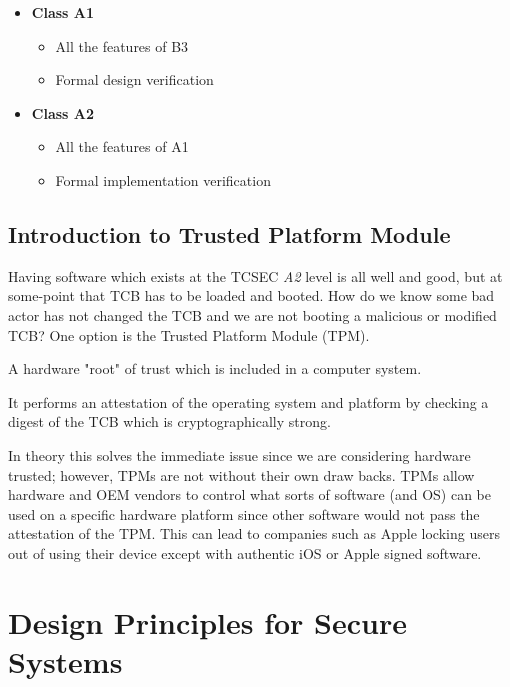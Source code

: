 \begin{itemize}
      \item \textbf{Class A1}
      \begin{itemize}
        \item All the features of B3
        \item Formal design verification
      \end{itemize}
      \item \textbf{Class A2}
      \begin{itemize}
        \item All the features of A1
        \item Formal implementation verification
      \end{itemize}
    \end{itemize}

  \subsection{Introduction to Trusted Platform Module}
  \label{ssec:intro_to_tpm}

    Having software which exists at the TCSEC \textit{A2} level is all well and good, but at some-point
      that TCB has to be loaded and booted.
    How do we know some bad actor has not changed the TCB and we are not booting a malicious or modified TCB?
    One option is the Trusted Platform Module (TPM).

    \begin{defbox}
      A hardware "root" of trust which is included in a computer system.

      It performs an attestation of the operating system and platform by checking a digest 
        of the TCB which is cryptographically strong.
    \end{defbox}

    In theory this solves the immediate issue since we are considering hardware trusted;
      however, TPMs are not without their own draw backs.
    TPMs allow hardware and OEM vendors to control what sorts of software (and OS) can be used
      on a specific hardware platform since other software would not pass the attestation of the TPM.
    This can lead to companies such as Apple locking users out of using their device except with authentic iOS
      or Apple signed software.

\section{Design Principles for Secure Systems}
\label{sec:design_principles_for_sec_systems}

